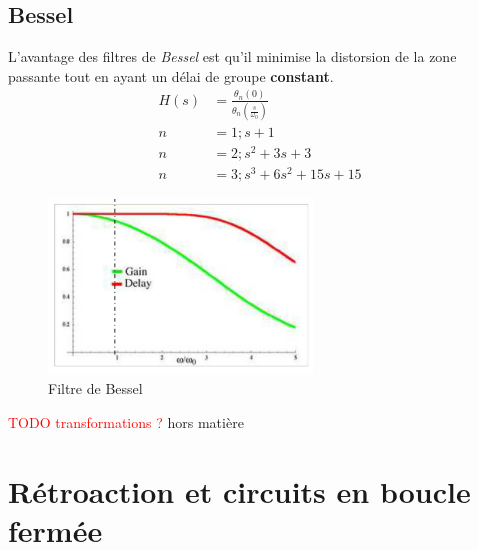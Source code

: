 \documentclass{report}
\begin{document}
\subsection{Bessel}
L'avantage des filtres de \textit{Bessel} est qu'il minimise la distorsion de la zone passante tout en ayant un délai de groupe \textbf{constant}.
\begin{align*}
H(s) &= \frac{\theta_n (0) }{\theta_n (\frac{s}{\omega_0 })}\\
n &= 1; s+1\\
n &= 2; s^2 + 3s + 3\\
n &= 3; s^3 + 6 s^2 + 15s + 15
\end{align*}
\begin{figure}[H]
\centering
\includegraphics[width=7cm]{img/Bessel.png}
\caption{Filtre de Bessel}
\end{figure}
\textcolor{red}{TODO transformations ?} hors matière

\section{Rétroaction et circuits en boucle fermée}
\end{document}
